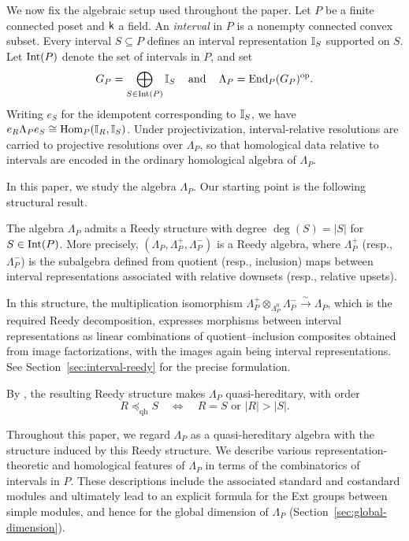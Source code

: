 We now fix the algebraic setup used throughout the paper.
Let $P$ be a finite connected poset and $\mathsf{k}$ a field.
An \emph{interval} in $P$ is a nonempty connected convex subset.
Every interval $S\subseteq P$ defines an interval representation
$\mathbb I_S$ supported on $S$.  Let $\operatorname{Int}(P)$ denote the set of intervals in
$P$, and set
\[
G_P
=
\bigoplus_{S\in\operatorname{Int}(P)}\mathbb I_S
\operatorname{\quad \text{and} \quad}\nolimits
\Lambda_P
=
\operatorname{End}_P(G_P)^{\mathrm{op}}.
\]
Writing $e_S$ for the idempotent corresponding to $\mathbb I_S$, we have $e_R\Lambda_Pe_S\cong\operatorname{Hom}_P(\mathbb I_R,\mathbb I_S)$.
Under projectivization, interval-relative resolutions are carried to
projective resolutions over $\Lambda_P$, so that homological data relative to intervals are encoded in the ordinary homological algebra of $\Lambda_P$.


\medskip
In this paper, we study the algebra $\Lambda_P$.
Our starting point is the following structural result.

\begin{theorem}
The algebra $\Lambda_P$ admits a Reedy structure with degree
$\deg(S)=|S|$ for $S\in\operatorname{Int}(P)$.  More precisely,
$(\Lambda_P,\Lambda_P^+,\Lambda_P^-)$ is a Reedy algebra, where
$\Lambda_P^+$ (resp., $\Lambda_P^-$) is the subalgebra defined
from quotient (resp., inclusion) maps between interval representations associated with relative downsets (resp., 
relative upsets).
\end{theorem}


In this structure, the multiplication isomorphism
$\Lambda_P^+\otimes_{\Lambda_P^0}\Lambda_P^-\xrightarrow{\sim}\Lambda_P$,
which is the required Reedy decomposition, expresses morphisms between
interval representations as linear combinations of quotient--inclusion
composites obtained from image factorizations, with the images again being
interval representations.
See Section~\ref{sec:interval-reedy} for the precise formulation.



By \cite[Theorem~4.22]{DS}, the resulting Reedy structure makes
$\Lambda_P$ quasi-hereditary, with order
\[
R\preceq_{\mathrm{qh}}S
\quad\Longleftrightarrow\quad
R=S
\text{ or }
|R|>|S|.
\]

Throughout this paper, we regard $\Lambda_P$ as a quasi-hereditary algebra
with the structure induced by this Reedy structure.  We describe
various representation-theoretic and homological features of $\Lambda_P$
in terms of the combinatorics of intervals in $P$.  These descriptions
include the associated standard and costandard modules and ultimately
lead to an explicit formula for the Ext groups between simple modules,
and hence for the global dimension of $\Lambda_P$
(Section~\ref{sec:global-dimension}).



